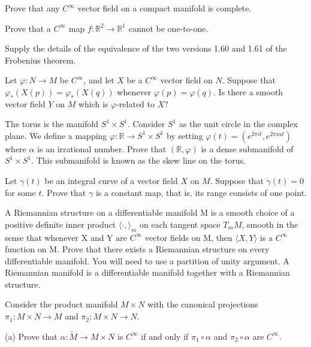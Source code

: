 \begin{problemset}
	\item Prove that any $C^{\infty}$ vector field on a compact manifold is complete.

	\item Prove that a $C^{\infty}$ map $f\colon \mathbb{R}^{2} \to \mathbb{R}^{1}$ cannot be one-to-one.

	\item Supply the details of the equivalence of the two versions 1.60 and 1.61 of the Frobenius theorem.

	\item Let $\varphi: N \to M$ be $C^\infty$, and let $X$ be a $C^\infty$ vector field on $N$. Suppose that $\varphi_{*}(X(p)) = \varphi_{*}(X(q))$ whenever $\varphi(p) = \varphi(q)$. Is there a smooth vector field $Y$ on $M$ which is $\varphi$-related to $X?$

	\item The torus is the manifold $S^{1} \times S^{1}$. Consider $S^{1}$ as the unit circle in the complex plane. We define a mapping $\varphi: \mathbb{R} \to S^{1} \times S^{1}$ by setting $\varphi(t) = (e^{2\pi i t}, e^{2\pi i\alpha t})$ where $\alpha$ is an irrational number. Prove that $(\mathbb{R}, \varphi)$ is a dense submanifold of $S^{1} \times S^{1}$. This submanifold is known as the skew line on the torus.  

	\item Let $\gamma(t)$ be an integral curve of a vector field $X$ on $M$. Suppose that $\dot{\gamma}(t)=0$ for some $t$. Prove that $\gamma$ is a constant map, that is, its range consists of one point.

	\item A Riemannian structure on a differentiable manifold M is a smooth choice of a positive definite inner product  $ \langle\cdot,\rangle_{m} $ on each tangent space  $ T_{m} M $, smooth in the sense that whenever X and Y are  $ C^{\infty} $ vector fields on M, then  $ \langle X,Y\rangle $ is a  $ C^{\infty} $ function on M. Prove that there exists a Riemannian structure on every differentiable manifold. You will need to use a partition of unity argument. A Riemannian manifold is a differentiable manifold together with a Riemannian structure.

	\item Consider the product manifold  $ M \times N $ with the canonical projections  $ \pi_1: M \times N \to M $ and  $ \pi_2\colon M \times N \to N $.

	(a) Prove that  $ \alpha\colon \tilde{M} \to M \times N $ is  $ C^\infty $ if and only if  $ \pi_1 \circ \alpha $ and  $ \pi_2 \circ \alpha $ are  $ C^\infty $. 


\end{problemset}
